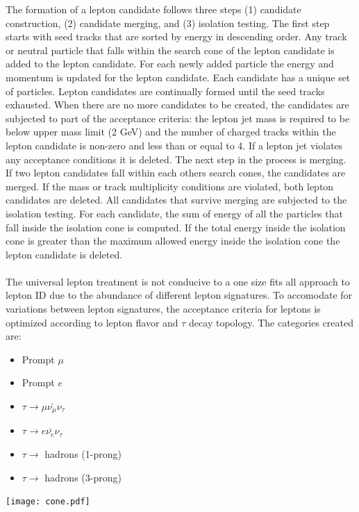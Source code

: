 The formation of a lepton candidate follows three steps (1) candidate construction, (2) candidate merging, and (3) isolation testing.
The first step starts with seed tracks that are sorted by energy in descending order. Any track or neutral particle that falls within the search cone of the lepton candidate is added to the lepton candidate. For each newly added particle the energy and momentum is updated for the lepton candidate. Each candidate has a unique set of particles. Lepton candidates are continually formed until the seed tracks exhausted. When there are no more candidates to be created, the candidates are subjected to part of the acceptance criteria: the lepton jet mass is required to be below upper mass limit (2 GeV) and the number of charged tracks within the lepton candidate is non-zero and less than or equal to 4. If a lepton jet violates any acceptance conditions it is deleted. The next step in the process is merging. If two lepton candidates fall within each others search cones, the candidates are merged. If the mass or track multiplicity conditions are violated, both lepton candidates are deleted.  All  candidates that survive merging are subjected to the isolation testing. For each candidate, the sum of energy of all the particles that fall inside the isolation cone is computed. If the total energy inside the isolation cone is greater than the maximum allowed energy inside the isolation cone the lepton candidate is deleted.\\
\quad \quad \\
The universal lepton treatment is not conducive to a one size fits all approach to lepton ID due to the abundance of different lepton signatures. To accomodate for variations between lepton signatures, the acceptance criteria for leptons is optimized according to lepton flavor and $\tau$ decay topology. The categories created are:\\

\begin{minipage}[h]{0.48\textwidth}
\centering
\begin{itemize}
\item Prompt $\mu$
\item Prompt $e$
\item $\tau \rightarrow \mu \bar{\nu_{\mu}} \nu_{\tau} $
\item $\tau \rightarrow e \bar{\nu_{e}} \nu_{\tau} $
\item $\tau \rightarrow$ hadrons (1-prong)
\item $\tau \rightarrow$ hadrons (3-prong)
\end{itemize}
\end{minipage}\hfill
\begin{minipage}[h]{0.48\textwidth}
\label{fig:cone}
\texttt{[image: cone.pdf]}

\end{minipage}\\


